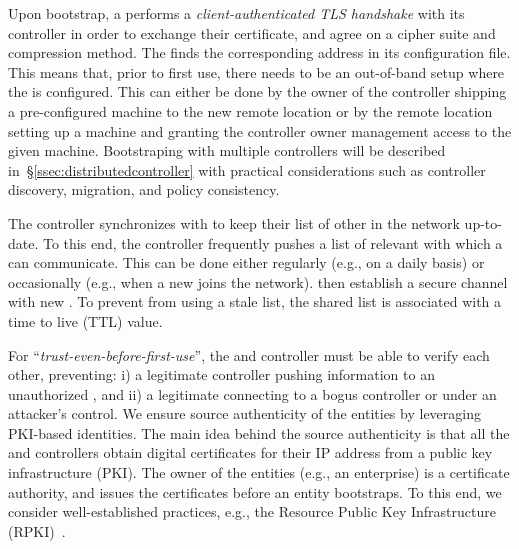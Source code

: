 Upon bootstrap, a \tp performs a \textit{client-authenticated TLS handshake} with its 
controller in order to exchange their certificate, and agree on a cipher suite and compression
method. The \tp finds the corresponding address in its configuration file. This means 
that, prior to first use, there needs to be an out-of-band setup where the \tp is 
configured. This can either be done by the owner of the controller shipping a pre-configured 
machine to the new remote location or by the remote location setting up a machine and 
granting the controller owner management access to the given machine. Bootstraping \tps 
with multiple controllers will be described in~\S\ref{ssec:distributedcontroller} with
practical considerations such as controller discovery, \tp migration, and policy consistency.

The controller synchronizes with \tps to keep their list of other \tps in the network 
up-to-date. To this end, the controller frequently pushes a list of relevant \tps with 
which a \tp can communicate.
This can be done either regularly (e.g., on a daily basis) or occasionally
(e.g., when a new \tp joins the network).
\tps then establish a secure channel with new \tps. To prevent \tps from using a stale \tp list,
the shared \tp list is associated with a time to live (TTL) value. 

For ``\textit{trust-even-before-first-use}'', 
the \tps and controller must be able to verify each 
other, preventing: i) a legitimate controller pushing information to an unauthorized \tp, 
and ii) a legitimate \tp connecting to a bogus controller or \tp under an attacker's control.
We ensure source authenticity of the \name entities by leveraging PKI-based identities.
The main idea behind the source authenticity is that all the \tps and controllers obtain
digital certificates for their IP address from a public key infrastructure (PKI). The owner 
of the entities (e.g., an enterprise) is a certificate authority, and issues the certificates
before an entity bootstraps. To this end, we consider well-established practices, e.g.,
the Resource Public Key Infrastructure (RPKI)~\cite{rfc7115,rfc6810}.

